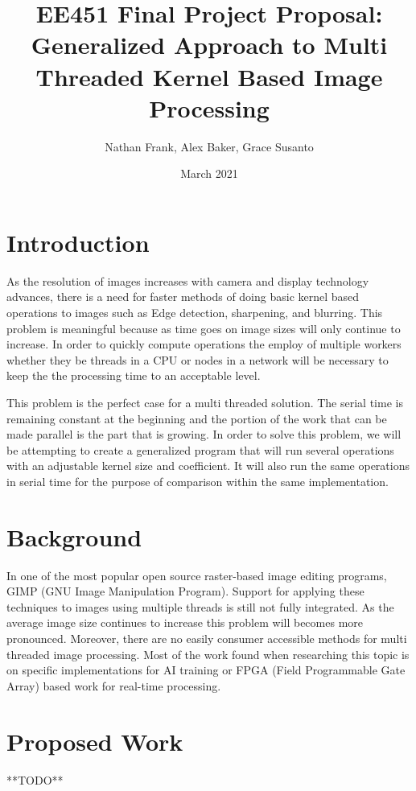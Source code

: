 \documentclass{article}
\title{EE451 Final Project Proposal: \\Generalized Approach to Multi Threaded Kernel Based Image Processing}
\author{Nathan Frank, Alex Baker, Grace Susanto}
\date{March 2021}
\begin{document}
\maketitle

\section{Introduction}

As the resolution of images increases with camera and display technology advances, there is a need for faster methods of doing basic kernel based operations to images such as Edge detection, sharpening, and blurring.  This problem is meaningful because as time goes on image sizes will only continue to increase.  In order to quickly compute operations the employ of multiple workers whether they be threads in a CPU or nodes in a network will be necessary to keep the the processing time to an acceptable level.  

This problem is the perfect case for a multi threaded solution.  The serial time is remaining constant at the beginning and the portion of the work that can be made parallel is the part that is growing.  In order to solve this problem, we will be attempting to create a generalized program that will run several operations with an adjustable kernel size and coefficient.  It will also run the same operations in serial time for the purpose of comparison within the same implementation.

\section{Background}

In one of the most popular open source raster-based image editing programs, GIMP (GNU Image Manipulation Program).  Support for applying these techniques to images using multiple threads is still not fully integrated.  As the average image size continues to increase this problem will becomes more pronounced.  Moreover, there are no easily consumer accessible methods for multi threaded image processing.  Most of the work found when researching this topic is on specific implementations for AI training or FPGA (Field Programmable Gate Array) based work for real-time processing.

\section{Proposed Work}

**TODO**
\end{document}

